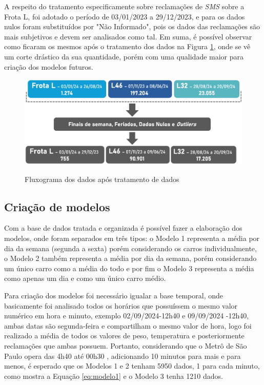 \documentclass[acronym,symbols,table]{fei}
\begin{document}
A respeito do tratamento especificamente sobre reclamações de \textit{SMS} sobre a Frota L, foi adotado o  período de 03/01/2023 a 29/12/2023, e para os dados nulos foram substituídos por "Não Informado", pois os dados das reclamações são mais subjetivos e devem ser analisados como tal. Em suma, é possível observar como ficaram os mesmos após o tratamento dos dados na Figura \ref{fig:Fluxograma_tratamento_dados}, onde se vê um corte drástico da sua quantidade, porém com uma qualidade maior para criação dos modelos futuros.
  
\begin{figure}[!htb]
    \centering
    \caption{Fluxograma dos dados após tratamento de dados}
    \includegraphics[width=0.8\linewidth]{Imagens/Fluxograma_tratamento_dados.png}
    \label{fig:Fluxograma_tratamento_dados}
\end{figure}

\subsection{Criação de modelos}

Com a base de dados tratada e organizada é possível fazer a elaboração dos modelos, onde foram separados em três tipos: o Modelo 1 representa a média por dia da semana (segunda a sexta) porém considerando os carros individualmente, o Modelo 2 também representa a média por dia da semana, porém considerando um único carro como a média do todo e por fim o Modelo 3 representa a média como apenas um dia e como um único carro médio.

Para criação dos modelos foi necessário igualar a base temporal, onde basicamente foi analisado todos os horários que possuíssem o mesmo valor numérico em hora e minuto, exemplo 02/09/2024-12h40 e 09/09/2024 -12h40, ambas datas são segunda-feira e compartilham o mesmo valor de hora, logo foi realizado a média de todos os valores de peso, temperatura e posteriormente reclamações que ambas possuem. Portanto, considerando que o Metrô de São Paulo opera das 4h40 até 00h30 \cite{horariosmetro}, adicionando 10 minutos para mais e para menos, é esperado que os Modelos 1 e 2 tenham 5950 dados, 1 para cada minuto, como mostra a Equação \ref{eq:modelo1} e o Modelo 3 tenha 1210 dados.
\end{document}
